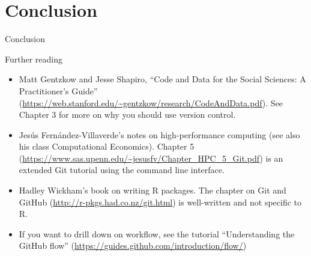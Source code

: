 \documentclass{beamer}
\begin{document}
\section*{Conclusion}

\begin{frame}{Conclusion}
\end{frame}

\begin{frame}{Further reading}
\begin{itemize}
\item Matt Gentzkow and Jesse Shapiro, ``Code and Data for the Social Sciences: A Practitioner’s Guide'' (\url{https://web.stanford.edu/~gentzkow/research/CodeAndData.pdf}). See Chapter 3 for more on why you should use version control.
\item Jes\'us Fern\'andez-Villaverde's notes on high-performance computing (see also his class Computational Economics). Chapter 5 (\url{https://www.sas.upenn.edu/~jesusfv/Chapter_HPC_5_Git.pdf}) is an extended Git tutorial using the command line interface.
\item Hadley Wickham's book on writing R packages. The chapter on Git and GitHub (\url{http://r-pkgs.had.co.nz/git.html}) is well-written and not specific to R.
\item If you want to drill down on workflow, see the tutorial ``Understanding the GitHub flow'' (\url{https://guides.github.com/introduction/flow/})
\end{itemize}
\end{frame}
\end{document}
